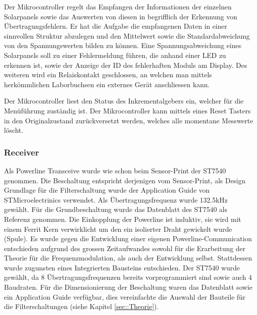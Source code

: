 Der Mikrocontroller regelt das Empfangen der Informationen der einzelnen Solarpanels sowie das Auswerten von diesen in begrifflich der Erkennung von Übertragungsfehlern. Er hat die Aufgabe die empfangenen Daten in einer sinnvollen Struktur abzulegen und den Mittelwert sowie die Standardabweichung von den Spannungswerten bilden zu können. Eine Spannungsabweichung eines Solarpanels soll zu einer Fehlermeldung führen, die anhand einer LED zu erkennen ist, sowie der Anzeige der ID des fehlerhaften Moduls am Display. Des weiteren wird ein Relaiskontakt geschlossen, an welchen man mittels herkömmlichen Laborbuchsen ein externes Gerät anschliessen kann.

Der Mikrocontroller liest den Status des Inkrementalgebers ein, welcher für die Menüführung zuständig ist. Der Mikrocontroller kann mittels eines Reset Tasters in den Originalzustand zurückversetzt werden, welches alle momentane Messwerte löscht.

\subsubsection{Receiver}
Als Powerline Transceive wurde wie schon beim Sensor-Print der ST7540 genommen. Die Beschaltung entspricht derjenigen vom Sensor-Print, als Design Grundlage für die Filterschaltung wurde der Application Guide \cite[p. 48]{Applic_Guide_ST7540} von STMicroelectrinics verwendet. Als Übertragungsfrequenz wurde 132.5kHz gewählt. Für die Grundbeschaltung wurde das Datenblatt des ST7540 \cite[p. 40]{Datasheet_ST7540} als Referenz genommen. Die Einkopplung der Powerline ist induktiv, sie wird mit einem Ferrit Kern verwirklicht um den ein isolierter Draht gewickelt wurde (Spule).
Es wurde gegen die Entwicklung einer eigenen Powerline-Communication entschieden aufgrund des grossen Zeitaufwandes sowohl für die Erarbeitung der Theorie für die Frequenzmodulation, als auch der Entwicklung selbst. Stattdessen wurde zugunsten eines Integrierten Bausteins entschieden. Der ST7540 wurde gewählt, da 8 Übertragungsfrequenzen bereits vorprogrammiert sind sowie auch 4 Baudraten. Für die Dimensionierung der Beschaltung waren das Datenblatt \cite{Datasheet_ST7540} sowie ein Application Guide \cite{Applic_Guide_ST7540} verfügbar, dies vereinfachte die Auswahl der Bauteile für die Filterschaltungen (siehe Kapitel \ref{sec::Theorie}).

